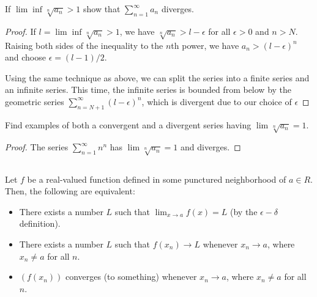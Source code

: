 If $\lim \inf \sqrt[n]{a_n} > 1$  show that $\sum_{n=1}^\infty a_n$ diverges.

\begin{proof}

If $l = \lim \inf \sqrt[n]{a_n} > 1$, we have $\sqrt[n]{a_n} > l - \epsilon$ for all $\epsilon > 0$ and $n > N$. Raising both sides of the inequality to the $n$th power, we have $a_n > (l - \epsilon)^n$ and choose $\epsilon = (l-1)/2$.

Using the same technique as above, we can split the series into a finite series and an infinite series. This time, the infinite series is bounded from below by the geometric series $\sum_{n=N+1}^\infty (l - \epsilon)^n$, which is divergent due to our choice of $\epsilon$

\end{proof}


Find  examples of  both a  convergent and a  divergent series having $\lim \sqrt[n]{a_n} = 1$.
 
\begin{proof}
The series  $\sum_{n=1}^\infty n^n$ has $\lim \sqrt[n]{a_n} = 1$ and diverges.

\end{proof}



\subsection{} Let $f$ be a real-valued function defined in some punctured neighborhood of $a \in R$. Then, the following are equivalent: 

\begin{itemize}
\item There exists a number $L$ such that $\lim_{x\rightarrow a} f(x) = L$ (by the $\epsilon - \delta$ definition).
\item There exists a number $L$ such that $f(x_n) \rightarrow L$ whenever $x_n \rightarrow a$, where $x_n \neq a$ for all $n$.
\item $(f(x_n))$ converges (to something) whenever $x_n \rightarrow a$, where $x_n \neq a$ for all $n$.
\end{itemize}


